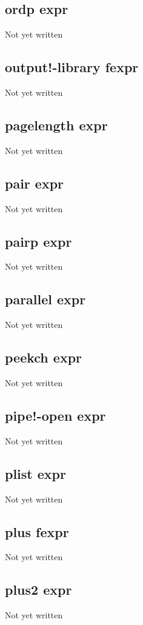 \documentclass[a4paper,11pt]{article}
\begin{document}
\subsection{\ttfamily ordp expr}
Not yet written

\subsection{\ttfamily output!-library fexpr}
Not yet written

\subsection{\ttfamily pagelength expr}
Not yet written

\subsection{\ttfamily pair expr}
Not yet written

\subsection{\ttfamily pairp expr}
Not yet written

\subsection{\ttfamily parallel expr}
Not yet written

\subsection{\ttfamily peekch expr}
Not yet written

\subsection{\ttfamily pipe!-open expr}
Not yet written

\subsection{\ttfamily plist expr}
Not yet written

\subsection{\ttfamily plus fexpr}
Not yet written

\subsection{\ttfamily plus2 expr}
Not yet written
\end{document}
